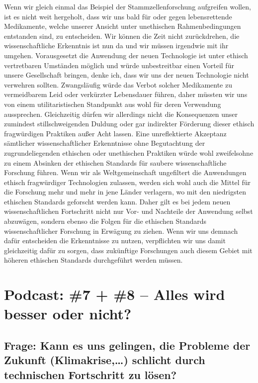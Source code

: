 \documentclass[twoside, a4paper, DIV=11, open=any, bibliography=totoc]{scrbook}
\begin{document}
Wenn wir gleich einmal das Beispiel der Stammzellenforschung aufgreifen wollen,
ist es nicht weit hergeholt, dass wir uns bald für oder gegen lebensrettende Medikamente,
welche unserer Ansicht unter unethischen Rahmenbedingungen entstanden sind, zu entscheiden.
Wir können die Zeit nicht zurückdrehen, die wissenschaftliche Erkenntnis ist nun da
und wir müssen irgendwie mit ihr umgehen. Vorausgesetzt die Anwendung der neuen
Technologie ist unter ethisch vertretbaren Umständen möglich und würde unbestreitbar
einen Vorteil für unsere Gesellschaft bringen, denke ich, dass wir
uns der neuen Technologie nicht verwehren sollten. Zwangsläufig würde das Verbot
solcher Medikamente zu vermeidbarem Leid oder verkürzter Lebensdauer führen, daher
müssten wir uns von einem utilitaristischen Standpunkt aus wohl für deren Verwendung aussprechen.
Gleichzeitig dürfen wir allerdings nicht die Konsequenzen unser zumindest stillschweigenden
Duldung oder gar indirekter Förderung dieser ethisch fragwürdigen Praktiken außer Acht lassen.
Eine unreflektierte Akzeptanz sämtlicher wissenschaftlicher Erkenntnisse ohne
Begutachtung der zugrundeliegenden ethischen oder unethischen Praktiken würde wohl
zweifelsohne zu einem Absinken der ethischen Standards für saubere wissenschaftliche Forschung führen.
Wenn wir als Weltgemeinschaft ungefiltert die Anwendungen ethisch fragwürdiger Technologien
zulassen, werden sich wohl auch die Mittel für die Forschung mehr und mehr in jene Länder
verlagern, wo mit den niedrigsten ethischen Standards geforscht werden kann.
Daher gilt es bei jedem neuen wissenschaftlichen Fortschritt nicht nur Vor- und Nachteile
der Anwendung selbst abzuwägen, sondern ebenso die Folgen für die ethischen Standards
wissenschaftlicher Forschung in Erwägung zu ziehen.
Wenn wir uns demnach dafür entscheiden die Erkenntnisse zu nutzen, verpflichten
wir uns damit gleichzeitig dafür zu sorgen, dass zukünftige Forschungen auch diesem
Gebiet mit höheren ethischen Standards durchgeführt werden müssen.

\section{Podcast: \#7 + \#8 -- Alles wird besser oder nicht?}

\subsection{Frage: Kann es uns gelingen, die Probleme der Zukunft (Klimakrise,\dots)
schlicht durch technischen Fortschritt zu lösen?}
\end{document}
